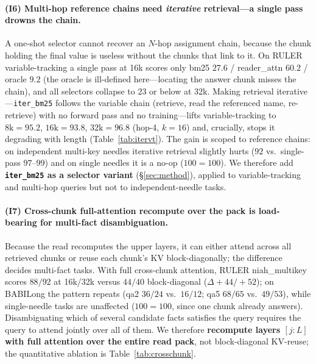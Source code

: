\paragraph{(I6) Multi-hop reference chains need \emph{iterative} retrieval---a
single pass drowns the chain.} A one-shot selector cannot recover an $N$-hop
assignment chain, because the chunk holding the final value is useless without
the chunks that link to it. On RULER variable-tracking a single pass at 16k
scores only bm25 $27.6$ / reader\_attn $60.2$ / oracle $9.2$ (the oracle is
ill-defined here---locating the answer chunk misses the chain), and all selectors
collapse to $23$ or below at 32k. Making retrieval iterative---\texttt{iter\_bm25}
follows the variable chain (retrieve, read the referenced name, re-retrieve)
with no forward pass and no training---lifts variable-tracking to
$8\text{k}{=}95.2$, $16\text{k}{=}93.8$, $32\text{k}{=}96.8$ (hop-4, $k{=}16$)
and, crucially, stops it degrading with length (Table~\ref{tab:itervt}). The
gain is scoped to reference chains: on independent multi-key needles iterative
retrieval slightly hurts ($92$ vs.\ single-pass $97$--$99$) and on single needles
it is a no-op ($100{=}100$). We therefore add \textbf{\texttt{iter\_bm25} as a
selector variant} (\S\ref{sec:method}), applied to variable-tracking and
multi-hop queries but not to independent-needle tasks.

\paragraph{(I7) Cross-chunk full-attention recompute over the pack is
load-bearing for multi-fact disambiguation.} Because the read recomputes the
upper layers, it can either attend across all retrieved chunks or reuse each
chunk's KV block-diagonally; the difference decides multi-fact tasks. With full
cross-chunk attention, RULER niah\_multikey scores $88/92$ at 16k/32k versus
$44/40$ block-diagonal ($\Delta{+}44/{+}52$); on BABILong the pattern repeats
(qa2 $36/24$ vs.\ $16/12$; qa5 $68/65$ vs.\ $49/53$), while single-needle tasks
are unaffected ($100{=}100$, since one chunk already answers). Disambiguating
which of several candidate facts satisfies the query requires the query to
attend jointly over all of them. We therefore \textbf{recompute layers $[j{:}L]$
with full attention over the entire read pack}, not block-diagonal KV-reuse; the
quantitative ablation is Table~\ref{tab:crosschunk}.
